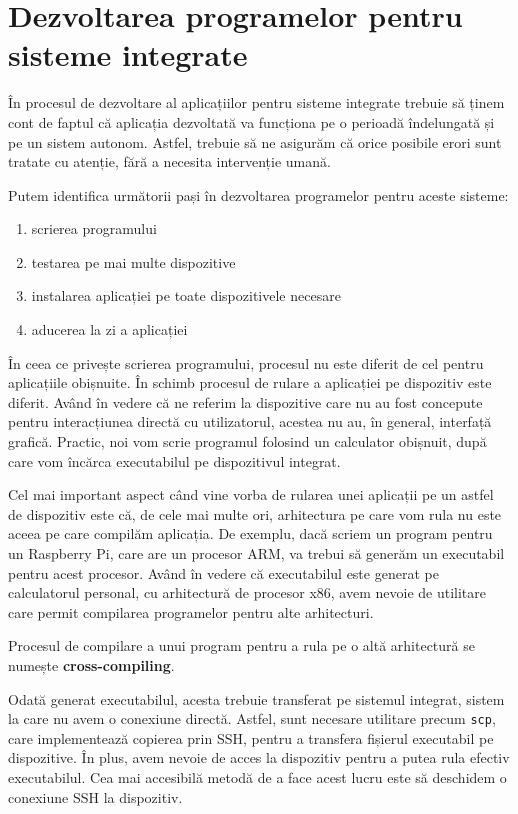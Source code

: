 \section{Dezvoltarea programelor pentru sisteme integrate}
\label{sec:embed:dev}

În procesul de dezvoltare al aplicațiilor pentru sisteme integrate trebuie să ținem cont de faptul că aplicația dezvoltată va funcționa pe o perioadă îndelungată și pe un sistem autonom.
Astfel, trebuie să ne asigurăm că orice posibile erori sunt tratate cu atenție, fără a necesita intervenție umană.

Putem identifica următorii pași în dezvoltarea programelor pentru aceste sisteme:

\begin{enumerate}
  \item scrierea programului
  \item testarea pe mai multe dispozitive
  \item instalarea aplicației pe toate dispozitivele necesare
  \item aducerea la zi a aplicației
\end{enumerate}

În ceea ce privește scrierea programului, procesul nu este diferit de cel pentru aplicațiile obișnuite.
În schimb procesul de rulare a aplicației pe dispozitiv este diferit.
Având în vedere că ne referim la dispozitive care nu au fost concepute pentru interacțiunea directă cu utilizatorul, acestea nu au, în general, interfață grafică.
Practic, noi vom scrie programul folosind un calculator obișnuit, după care vom încărca executabilul pe dispozitivul integrat.

Cel mai important aspect când vine vorba de rularea unei aplicații pe un astfel de dispozitiv este că, de cele mai multe ori, arhitectura pe care vom rula nu este aceea pe care compilăm aplicația.
De exemplu, dacă scriem un program pentru un Raspberry Pi, care are un procesor ARM, va trebui să generăm un executabil pentru acest procesor.
Având în vedere că executabilul este generat pe calculatorul personal, cu arhitectură de procesor x86, avem nevoie de utilitare care permit compilarea programelor pentru alte arhitecturi.

Procesul de compilare a unui program pentru a rula pe o altă arhitectură se numește \textbf{cross-compiling}.

Odată generat executabilul, acesta trebuie transferat pe sistemul integrat, sistem la care nu avem o conexiune directă.
Astfel, sunt necesare utilitare precum \texttt{scp}, care implementează copierea prin SSH, pentru a transfera fișierul executabil pe dispozitive.
În plus, avem nevoie de acces la dispozitiv pentru a putea rula efectiv executabilul.
Cea mai accesibilă metodă de a face acest lucru este să deschidem o conexiune SSH la dispozitiv.

